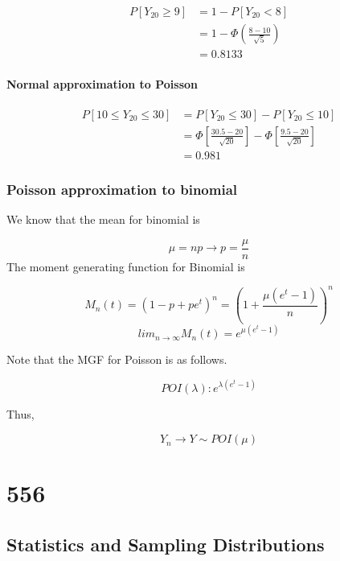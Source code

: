 \documentclass[
]{book}
\begin{document}
\[\begin{aligned} P[Y_{20} \geq 9] &=1-P[Y_{20}<8] \\ &=1- \Phi(\frac{8-10}{\sqrt{5}}) \\&=0.8133 \end{aligned} \]

\hypertarget{normal-approximation-to-poisson}{%
\subsubsection{Normal approximation to Poisson}\label{normal-approximation-to-poisson}}

\[\begin{aligned} P[10\leq Y_{20} \leq 30] &=P[ Y_{20} \leq 30]-P[ Y_{20} \leq 10] \\&=\Phi[\frac{30.5-20}{\sqrt{20}}]-\Phi[\frac{9.5-20}{\sqrt{20}}] \\ &=0.981 \end{aligned}\]

\hypertarget{poisson-approximation-to-binomial}{%
\subsection{Poisson approximation to binomial}\label{poisson-approximation-to-binomial}}

We know that the mean for binomial is

\[\mu=np \rightarrow p=\frac{\mu}{n}\]
The moment generating function for Binomial is

\[M_n(t)=(1-p+pe^t)^n=(1+\frac{\mu (e^t-1)}{n})^n\]
\[lim_{n \rightarrow \infty} M_n(t)=e^{\mu (e^t-1)}\]

Note that the MGF for Poisson is as follows.

\[POI(\lambda): e^{\lambda(e^t-1)}\]

Thus,

\[Y_n \rightarrow Y \sim POI (\mu)\]

\hypertarget{section-1}{%
\chapter{556}\label{section-1}}

\hypertarget{statistics-and-sampling-distributions}{%
\section{Statistics and Sampling Distributions}\label{statistics-and-sampling-distributions}}
\end{document}
